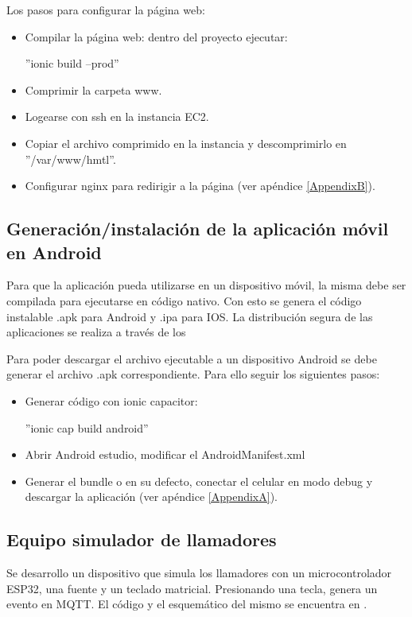 Los pasos para configurar la página web:
\begin{itemize}
\item Compilar la página web: dentro del proyecto ejecutar:

''ionic build --prod''
\item Comprimir la carpeta www.
\item Logearse con ssh en la instancia EC2.
\item Copiar el archivo comprimido en la instancia y descomprimirlo en ''/var/www/hmtl''.
\item Configurar nginx para redirigir a la página (ver apéndice \ref{AppendixB}).

\end{itemize}
\subsection{Generación/instalación de la aplicación móvil en Android}

Para que la aplicación pueda utilizarse en un dispositivo móvil, la misma debe ser compilada para ejecutarse en código nativo. Con esto se genera el código instalable .apk para Android y .ipa para IOS. La distribución segura de las aplicaciones se realiza a través de los  

Para poder descargar el archivo ejecutable a un dispositivo Android se debe generar el archivo .apk correspondiente. Para ello seguir los siguientes pasos:

\begin{itemize}
\item Generar código con ionic capacitor:

''ionic cap build android''
\item Abrir Android estudio, modificar el AndroidManifest.xml
\item Generar el bundle o en su defecto, conectar el celular en modo debug y descargar la aplicación (ver apéndice \ref{AppendixA}).
\end{itemize}
\pagebreak

\pagebreak
\subsection{Equipo simulador de llamadores}

Se desarrollo un dispositivo que simula los llamadores con un microcontrolador ESP32, una fuente y un teclado matricial. Presionando una tecla, genera un evento en MQTT. El código y el esquemático del mismo se encuentra en \citep{WEBSITE:33}. 

